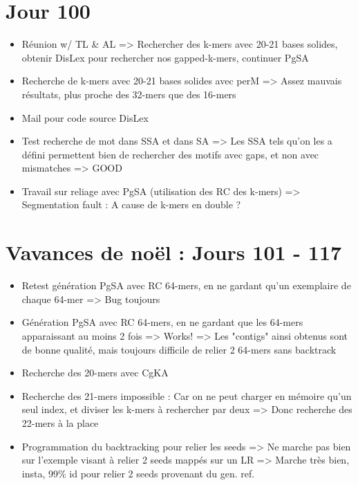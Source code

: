 \documentclass[12pt]{report}
\begin{document}
\section{Jour 100}

\begin{itemize}
	\item Réunion w/ TL \& AL  => Rechercher des k-mers avec 20-21 bases solides, obtenir DisLex pour rechercher nos gapped-k-mers, continuer PgSA
	
	\item Recherche de k-mers avec 20-21 bases solides avec perM => Assez mauvais résultats, plus proche des 32-mers que des 16-mers
	
	\item Mail pour code source DisLex
	
	\item Test recherche de mot dans SSA et dans SA => Les SSA tels qu'on les a défini permettent bien de rechercher
		  des motifs avec gaps, et non avec mismatches => GOOD
	
	\item Travail sur reliage avec PgSA (utilisation des RC des k-mers) => Segmentation fault : A cause de k-mers en double ?
\end{itemize}

\section{Vavances de noël : Jours 101 - 117}

\begin{itemize}
	\item Retest génération PgSA avec RC 64-mers, en ne gardant qu'un exemplaire de chaque 64-mer => Bug toujours
	
	\item Génération PgSA avec RC 64-mers, en ne gardant que les 64-mers apparaissant au moins 2 fois => Works!
		  => Les "contigs" ainsi obtenus sont de bonne qualité, mais toujours difficile de relier 2 64-mers sans backtrack
	
	\item Recherche des 20-mers avec CgKA
	
	\item Recherche des 21-mers impossible : Car on ne peut charger en mémoire qu'un seul index, et diviser les k-mers à rechercher par deux
		  => Donc recherche des 22-mers à la place
		  
	\item Programmation du backtracking pour relier les seeds
		  => Ne marche pas bien sur l'exemple visant à relier 2 seeds mappés sur un LR
		  => Marche très bien, insta, 99\% id pour relier 2 seeds provenant du gen. ref.
\end{itemize}
\end{document}
